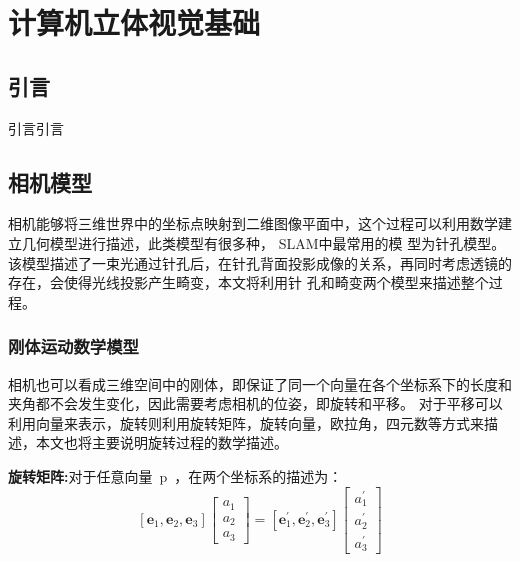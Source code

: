 \chapter{计算机立体视觉基础}
\label{cha:chapVSLAM}
\section{引言}
\label{sec:chapVSLAM.1}
引言引言
\section{相机模型}
相机能够将三维世界中的坐标点映射到二维图像平面中，这个过程可以利用数学建立几何模型进行描述，此类模型有很多种， SLAM中最常用的模
型为针孔模型。该模型描述了一束光通过针孔后，在针孔背面投影成像的关系，再同时考虑透镜的存在，会使得光线投影产生畸变，本文将利用针
孔和畸变两个模型来描述整个过程。
\subsection{刚体运动数学模型}
相机也可以看成三维空间中的刚体，即保证了同一个向量在各个坐标系下的长度和夹角都不会发生变化，因此需要考虑相机的位姿，即旋转和平移。
对于平移可以利用向量来表示，旋转则利用旋转矩阵，旋转向量，欧拉角，四元数等方式来描述，本文也将主要说明旋转过程的数学描述。

\textbf{旋转矩阵:}对于任意向量{~p~}，在两个坐标系的描述为：
\begin{equation}
  \left[\mathbf{e}_{1}, \mathbf{e}_{2}, \mathbf{e}_{3}\right]\left[\begin{array}{l}{a_{1}} \\ {a_{2}} \\ {a_{3}}\end{array}\right]=\left[\mathbf{e}_{1}^{\prime}, \mathbf{e}_{2}^{\prime}, \mathbf{e}_{3}^{\prime}\right]\left[\begin{array}{c}{a_{1}^{\prime}} \\ {a_{2}^{\prime}} \\ {a_{3}^{\prime}}\end{array}\right]
\end{equation}

